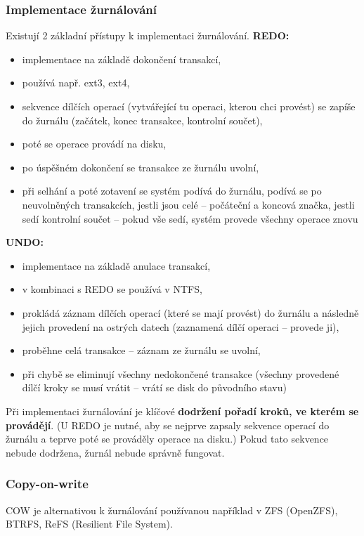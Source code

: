 \documentclass[a4paper, 11pt]{article}
\begin{document}
\subsubsection{Implementace žurnálování}
Existují 2 základní přístupy k implementaci žurnálování.
\textbf{REDO:}
\begin{itemize}
    \item implementace na základě dokončení transakcí,
    \item používá např. ext3, ext4,
    \item sekvence dílčích operací (vytvářející tu operaci, kterou chci provést) se zapíše do žurnálu (začátek, konec transakce, kontrolní součet),
    \item poté se operace provádí na disku,
    \item po úspěšném dokončení se transakce ze žurnálu uvolní,
    \item při selhání a poté zotavení se systém podívá do žurnálu, podívá se po neuvolněných transakcích, jestli jsou celé -- počáteční a koncová značka, jestli sedí kontrolní součet -- pokud vše sedí, systém provede všechny operace znovu
\end{itemize}

\textbf{UNDO:}
\begin{itemize}
    \item implementace na základě anulace transakcí,
    \item v kombinaci s REDO se používá v NTFS,
    \item prokládá záznam dílčích operací (které se mají provést) do žurnálu a následně jejich provedení na ostrých datech (zaznamená dílčí operaci -- provede ji),
    \item proběhne celá transakce -- záznam ze žurnálu se uvolní,
    \item při chybě se eliminují všechny nedokončené transakce (všechny provedené dílčí kroky se musí vrátit -- vrátí se disk do původního stavu)
\end{itemize}
 
Při implementaci žurnálování je klíčové \textbf{dodržení pořadí kroků, ve kterém se provádějí}. (U REDO je nutné, aby se nejprve zapsaly sekvence operací do žurnálu a teprve poté se prováděly operace na disku.) Pokud tato sekvence nebude dodržena, žurnál nebude správně fungovat.


\subsubsection{Copy-on-write}
COW je alternativou k žurnálování používanou například v ZFS (OpenZFS), BTRFS, ReFS (Resilient File System).
\end{document}
